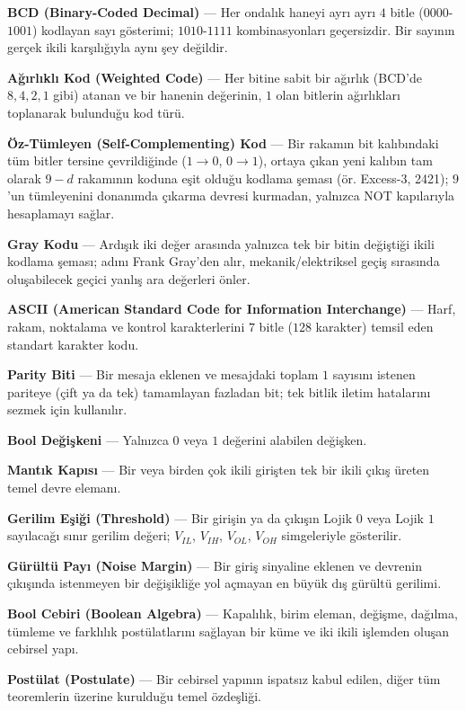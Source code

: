\textbf{BCD (Binary-Coded Decimal)} --- Her ondalık haneyi ayrı ayrı $4$ bitle ($0000$-
$1001$) kodlayan sayı gösterimi; $1010$-$1111$ kombinasyonları geçersizdir. Bir sayının
gerçek ikili karşılığıyla aynı şey değildir.

\textbf{Ağırlıklı Kod (Weighted Code)} --- Her bitine sabit bir ağırlık (BCD'de $8,4,2,1$
gibi) atanan ve bir hanenin değerinin, $1$ olan bitlerin ağırlıkları toplanarak bulunduğu
kod türü.

\textbf{Öz-Tümleyen (Self-Complementing) Kod} --- Bir rakamın bit kalıbındaki tüm bitler
tersine çevrildiğinde ($1\to0$, $0\to1$), ortaya çıkan yeni kalıbın tam olarak $9-d$
rakamının koduna eşit olduğu kodlama şeması (ör. Excess-3, 2421); $9$'un tümleyenini
donanımda çıkarma devresi kurmadan, yalnızca NOT kapılarıyla hesaplamayı sağlar.

\textbf{Gray Kodu} --- Ardışık iki değer arasında yalnızca tek bir bitin değiştiği ikili
kodlama şeması; adını Frank Gray'den alır, mekanik/elektriksel geçiş sırasında oluşabilecek
geçici yanlış ara değerleri önler.

\textbf{ASCII (American Standard Code for Information Interchange)} --- Harf, rakam,
noktalama ve kontrol karakterlerini $7$ bitle ($128$ karakter) temsil eden standart
karakter kodu.

\textbf{Parity Biti} --- Bir mesaja eklenen ve mesajdaki toplam $1$ sayısını istenen
pariteye (çift ya da tek) tamamlayan fazladan bit; tek bitlik iletim hatalarını sezmek için
kullanılır.

\textbf{Bool Değişkeni} --- Yalnızca $0$ veya $1$ değerini alabilen değişken.

\textbf{Mantık Kapısı} --- Bir veya birden çok ikili girişten tek bir ikili çıkış üreten
temel devre elemanı.

\textbf{Gerilim Eşiği (Threshold)} --- Bir girişin ya da çıkışın Lojik $0$ veya Lojik $1$
sayılacağı sınır gerilim değeri; $V_{IL}$, $V_{IH}$, $V_{OL}$, $V_{OH}$ simgeleriyle
gösterilir.

\textbf{Gürültü Payı (Noise Margin)} --- Bir giriş sinyaline eklenen ve devrenin çıkışında
istenmeyen bir değişikliğe yol açmayan en büyük dış gürültü gerilimi.

\textbf{Bool Cebiri (Boolean Algebra)} --- Kapalılık, birim eleman, değişme, dağılma,
tümleme ve farklılık postülatlarını sağlayan bir küme ve iki ikili işlemden oluşan
cebirsel yapı.

\textbf{Postülat (Postulate)} --- Bir cebirsel yapının ispatsız kabul edilen, diğer tüm
teoremlerin üzerine kurulduğu temel özdeşliği.

